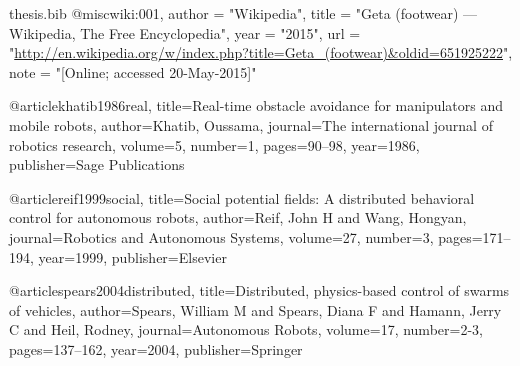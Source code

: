\documentclass[oneside, a4paper, 12pt]{memoir}
\begin{document}
\begin{filecontents}{thesis.bib}
@misc{wiki:001,
   author = "Wikipedia",
   title = "Geta (footwear) --- Wikipedia{,} The Free Encyclopedia",
   year = "2015",
   url = "\url{http://en.wikipedia.org/w/index.php?title=Geta_(footwear)&oldid=651925222}",
   note = "[Online; accessed 20-May-2015]"
 }
 
 @article{khatib1986real,
  title={Real-time obstacle avoidance for manipulators and mobile robots},
  author={Khatib, Oussama},
  journal={The international journal of robotics research},
  volume={5},
  number={1},
  pages={90--98},
  year={1986},
  publisher={Sage Publications}
}

@article{reif1999social,
  title={Social potential fields: A distributed behavioral control for autonomous robots},
  author={Reif, John H and Wang, Hongyan},
  journal={Robotics and Autonomous Systems},
  volume={27},
  number={3},
  pages={171--194},
  year={1999},
  publisher={Elsevier}
}

@article{spears2004distributed,
  title={Distributed, physics-based control of swarms of vehicles},
  author={Spears, William M and Spears, Diana F and Hamann, Jerry C and Heil, Rodney},
  journal={Autonomous Robots},
  volume={17},
  number={2-3},
  pages={137--162},
  year={2004},
  publisher={Springer}
}

\end{filecontents}



\end{document}
